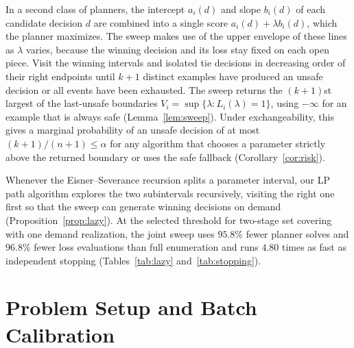\documentclass[a4paper,10pt]{article}
\theoremstyle{plain}
\theoremstyle{remark}
\begin{document}
In a second class of planners, the intercept $a_i(d)$ and slope $b_i(d)$ of each candidate decision $d$ are combined into a single score $a_i(d)+\lambda b_i(d)$, which the planner maximizes. The sweep makes use of the upper envelope of these lines as $\lambda$ varies, because the winning decision and its loss stay fixed on each open piece. Visit the winning intervals and isolated tie decisions in decreasing order of their right endpoints until $k+1$ distinct examples have produced an unsafe decision or all events have been exhausted. The sweep returns the $(k+1)$st largest of the last-unsafe boundaries $V_i=\sup\{\lambda:L_i(\lambda)=1\}$, using $-\infty$ for an example that is always safe (Lemma~\ref{lem:sweep}). Under exchangeability, this gives a marginal probability of an unsafe decision of at most $(k+1)/(n+1)\le\alpha$ for any algorithm that chooses a parameter strictly above the returned boundary or uses the safe fallback (Corollary~\ref{cor:risk}).

Whenever the Eisner--Severance recursion \cite{eisner} splits a parameter interval, our LP path algorithm explores the two subintervals recursively, visiting the right one first so that the sweep can generate winning decisions on demand (Proposition~\ref{prop:lazy}). At the selected threshold for two-stage set covering with one demand realization, the joint sweep uses $95.8\%$ fewer planner solves and $96.8\%$ fewer loss evaluations than full enumeration and runs $4.80$ times as fast as independent stopping (Tables~\ref{tab:lazy} and~\ref{tab:stopping}).

\section{Problem Setup and Batch Calibration}\label{sec:problem}
\end{document}
